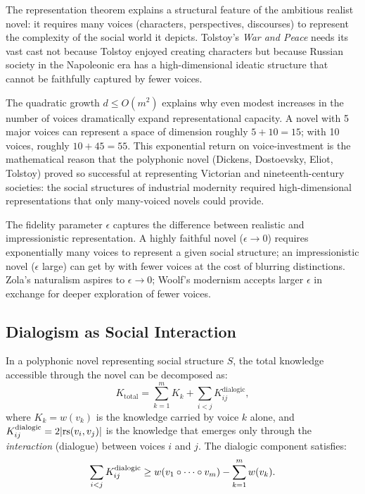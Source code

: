 \begin{interpretation}
\label{interp:representation}
The representation theorem explains a structural feature of the ambitious
realist novel: it requires many voices (characters, perspectives, discourses)
to represent the complexity of the social world it depicts.  Tolstoy's
\textit{War and Peace} needs its vast cast not because Tolstoy enjoyed
creating characters but because Russian society in the Napoleonic era has
a high-dimensional ideatic structure that cannot be faithfully captured by
fewer voices.

The quadratic growth $d \leq O(m^2)$ explains why even modest increases in
the number of voices dramatically expand representational capacity.  A novel
with 5 major voices can represent a space of dimension roughly $5 + 10 = 15$;
with 10 voices, roughly $10 + 45 = 55$.  This exponential return on
voice-investment is the mathematical reason that the polyphonic novel (Dickens,
Dostoevsky, Eliot, Tolstoy) proved so successful at representing Victorian and
nineteenth-century societies: the social structures of industrial modernity
required high-dimensional representations that only many-voiced novels could
provide.

The fidelity parameter $\epsilon$ captures the difference between realistic
and impressionistic representation.  A highly faithful novel ($\epsilon \to 0$)
requires exponentially many voices to represent a given social structure; an
impressionistic novel ($\epsilon$ large) can get by with fewer voices at the
cost of blurring distinctions.  Zola's naturalism aspires to $\epsilon \to 0$;
Woolf's modernism accepts larger $\epsilon$ in exchange for deeper exploration
of fewer voices.
\end{interpretation}

\subsection{Dialogism as Social Interaction}

\begin{theorem}
\label{thm:dialogic-social}
In a polyphonic novel representing social structure $S$, the total
knowledge accessible through the novel can be decomposed as:
\[
  K_{\text{total}} = \sum_{k=1}^{m} K_k + \sum_{i < j} K_{ij}^{\text{dialogic}},
\]
where $K_k = w(v_k)$ is the knowledge carried by voice $k$ alone, and
$K_{ij}^{\text{dialogic}} = 2|\mathrm{rs}(v_i, v_j)|$ is the knowledge that
emerges only through the \emph{interaction} (dialogue) between voices $i$
and $j$.  The dialogic component satisfies:
\[
  \sum_{i < j} K_{ij}^{\text{dialogic}} \geq
  w(v_1 \circ \cdots \circ v_m) - \sum_{k=1}^{m} w(v_k).
\]
\end{theorem}

